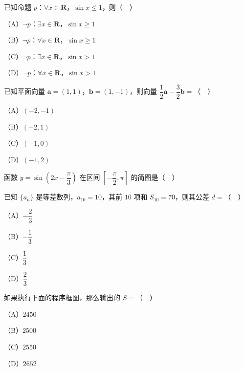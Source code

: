 


\begin{question}
已知命题 $p$：$\forall x\in\mathbf R$，$\sin x\leqslant1$，则（　）

（A）$\neg p$：$\exists x\in\mathbf R$，$\sin x\geqslant1$

（B）$\neg p$：$\forall x\in\mathbf R$，$\sin x\geqslant1$

（C）$\neg p$：$\exists x\in\mathbf R$，$\sin x>1$

（D）$\neg p$：$\forall x\in\mathbf R$，$\sin x>1$

\end{question}
\begin{question}
已知平面向量 $\boldsymbol a=(1,1)$，$\boldsymbol b=(1,-1)$，则向量 $\dfrac12\boldsymbol a-\dfrac32\boldsymbol b=$（　）

（A）$(-2,-1)$

（B）$(-2,1)$

（C）$(-1,0)$

（D）$(-1,2)$

\Needspace{0.4\textheight}
\end{question}
\begin{question}
函数 $y=\sin\left(2x-\dfrac{\pi}{3}\right)$ 在区间 $\left[-\dfrac{\pi}{2},\pi\right]$ 的简图是（　）
\nopagebreak[4]
\begin{center}\end{center}
\nopagebreak[4]
\end{question}
\begin{question}
已知 $\{a_n\}$ 是等差数列，$a_{10}=10$，其前 $10$ 项和 $S_{10}=70$，则其公差 $d=$（　）

（A）$-\dfrac23$

（B）$-\dfrac13$

（C）$\dfrac13$

（D）$\dfrac23$

\Needspace{0.4\textheight}
\end{question}
\begin{question}
如果执行下面的程序框图，那么输出的 $S=$（　）
\nopagebreak[4]
\begin{center}\end{center}
\nopagebreak[4]
（A）$2450$

（B）$2500$

（C）$2550$

（D）$2652$

\end{question}
